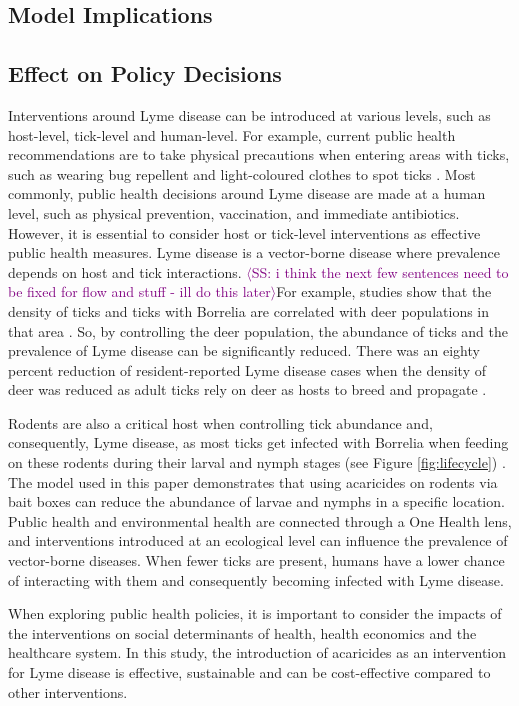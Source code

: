 \documentclass[12pt, centerh1]{article}
\newcommand{\sophie}[1]{{\textcolor{purple}{$\langle$SS: #1$\rangle$}}}
\begin{document}
\subsection{Model Implications}



\subsection{Effect on Policy Decisions}
Interventions around Lyme disease can be introduced at various levels, such as host-level, tick-level and human-level. For example, current public health recommendations are to take physical precautions when entering areas with ticks, such as wearing bug repellent and light-coloured clothes to spot ticks \citep{govcan}. Most commonly, public health decisions around Lyme disease are made at a human level, such as physical prevention, vaccination, and immediate antibiotics. However, it is essential to consider host or tick-level interventions as effective public health measures. Lyme disease is a vector-borne disease where prevalence depends on host and tick interactions. \sophie{i think the next few sentences need to be fixed for flow and stuff - ill do this later}For example, studies show that the density of ticks and ticks with Borrelia are correlated with deer populations in that area \citep{kilpatrick2014relationship}. So, by controlling the deer population, the abundance of ticks and the prevalence of Lyme disease can be significantly reduced. There was an eighty percent reduction of resident-reported Lyme disease cases when the density of deer was reduced as adult ticks rely on deer as hosts to breed and propagate \citep{kilpatrick2014relationship}.  

Rodents are also a critical host when controlling tick abundance and, consequently, Lyme disease, as most ticks get infected with Borrelia when feeding on these rodents during their larval and nymph stages (see Figure \ref{fig:lifecycle}) \citep{radolf2012ticks}. The model used in this paper demonstrates that using acaricides on rodents via bait boxes can reduce the abundance of larvae and nymphs in a specific location. Public health and environmental health are connected through a One Health lens, and interventions introduced at an ecological level can influence the prevalence of vector-borne diseases. When fewer ticks are present, humans have a lower chance of interacting with them and consequently becoming infected with Lyme disease. 

When exploring public health policies, it is important to consider the impacts of the interventions on social determinants of health, health economics and the healthcare system. In this study, the introduction of acaricides as an intervention for Lyme disease is effective, sustainable and can be cost-effective compared to other interventions. 
\end{document}
